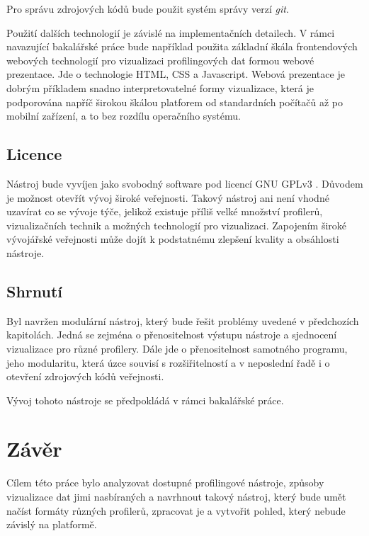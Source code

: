 \documentclass[czech,BP]{thesiskiv}
\begin{document}
Pro správu zdrojových kódů bude použit systém správy verzí \emph{git}.

Použití dalších technologií je závislé na implementačních detailech. V rámci navazující bakalářské práce bude například použita základní škála frontendových webových technologií pro vizualizaci profilingových dat formou webové prezentace. Jde o technologie HTML, CSS a Javascript. Webová prezentace je dobrým příkladem snadno interpretovatelné formy vizualizace, která je podporována napříč širokou škálou platforem od standardních počítačů až po mobilní zařízení, a to bez rozdílu operačního systému.

\section{Licence}

Nástroj bude vyvíjen jako svobodný software pod licencí GNU GPLv3 \cite{gplv3}. Důvodem je možnost otevřít vývoj široké veřejnosti. Takový nástroj ani není vhodné uzavírat co se vývoje týče, jelikož existuje příliš velké množství profilerů, vizualizačních technik a možných technologií pro vizualizaci. Zapojením široké vývojářské veřejnosti může dojít k podstatnému zlepšení kvality a obsáhlosti nástroje.

\section{Shrnutí}

Byl navržen modulární nástroj, který bude řešit problémy uvedené v předchozích kapitolách. Jedná se zejména o přenositelnost výstupu nástroje a sjednocení vizualizace pro různé profilery. Dále jde o přenositelnost samotného programu, jeho modularitu, která úzce souvisí s rozšiřitelností a v neposlední řadě i o otevření zdrojových kódů veřejnosti.

Vývoj tohoto nástroje se předpokládá v rámci bakalářské práce.



\newpage

\chapter{Závěr}

Cílem této práce bylo analyzovat dostupné profilingové nástroje, způsoby vizualizace dat jimi nasbíraných a navrhnout takový nástroj, který bude umět načíst formáty různých profilerů, zpracovat je a vytvořit pohled, který nebude závislý na platformě.
\end{document}
